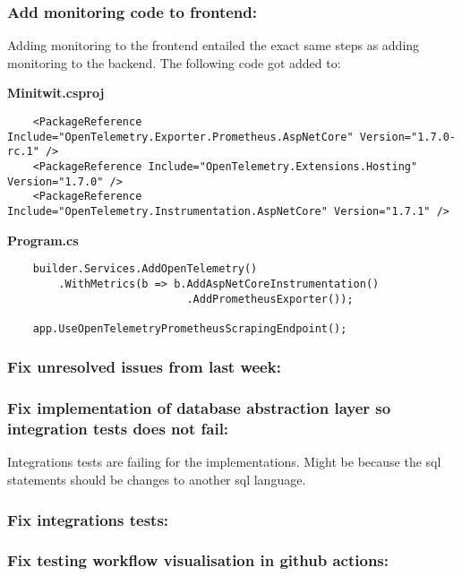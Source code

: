 \subsubsection{Add monitoring code to frontend:}
\label{log:add-monitoring-code-to-frontend}

Adding monitoring to the frontend entailed the exact same steps as
adding monitoring to the backend. The following code got added to:

\textbf{Minitwit.csproj}

\begin{verbatim}
    <PackageReference Include="OpenTelemetry.Exporter.Prometheus.AspNetCore" Version="1.7.0-rc.1" />
    <PackageReference Include="OpenTelemetry.Extensions.Hosting" Version="1.7.0" />
    <PackageReference Include="OpenTelemetry.Instrumentation.AspNetCore" Version="1.7.1" />
\end{verbatim}

\textbf{Program.cs}

\begin{verbatim}
    builder.Services.AddOpenTelemetry()
        .WithMetrics(b => b.AddAspNetCoreInstrumentation()
                            .AddPrometheusExporter());

    app.UseOpenTelemetryPrometheusScrapingEndpoint();
\end{verbatim}

\subsubsection{Fix unresolved issues from last week:}
\label{log:fix-unresolved-issues-from-last-week}

\subsubsection{Fix implementation of database abstraction layer so integration tests does not fail:}
\label{log:fix-implementation-of-database-abstraction-layer-so-integration-tests-does-not-fail}

Integrations tests are failing for the implementations. Might be because
the sql statements should be changes to another sql language.

\subsubsection{Fix integrations tests:}
\label{log:fix-integrations-tests}

\subsubsection{Fix testing workflow visualisation in github actions:}
\label{log:fix-testing-workflow-visualisation-in-github-actions}

